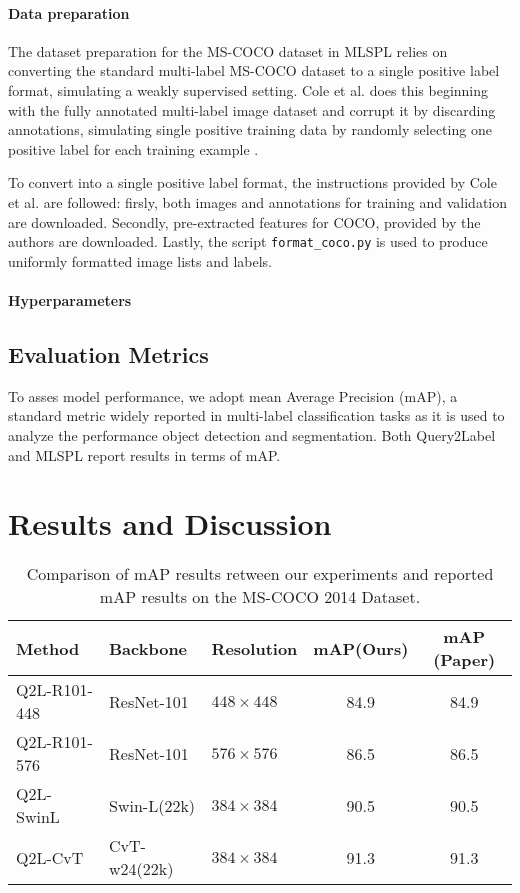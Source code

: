 \documentclass[lettersize,journal]{IEEEtran}
\begin{document}
\paragraph{Data preparation}
The dataset preparation for the MS-COCO dataset in MLSPL relies on converting the standard multi-label MS-COCO dataset to a single positive label format, simulating a weakly supervised setting. Cole et al. does this beginning with the fully annotated multi-label image dataset and corrupt it by discarding annotations, simulating single positive training data by randomly selecting one positive label for each training example \cite{mlsp}.

\vspace{1em}

To convert into a single positive label format, the instructions provided by Cole et al. are followed: firsly, both images and annotations for training and validation are downloaded. Secondly, pre-extracted features for COCO, provided by the authors are downloaded. Lastly, the script \texttt{format\_coco.py} is used to produce uniformly formatted image lists and labels.

\vspace{1em}

\paragraph{Hyperparameters}

\subsection{Evaluation Metrics}
To asses model performance, we adopt mean Average Precision (mAP), a standard metric widely reported in multi-label classification tasks as it is used to analyze the performance object detection and segmentation. Both Query2Label and MLSPL report results in terms of mAP. 


\section{Results and Discussion}
\begin{table*}[!t]
    \small
    \caption{Comparison of mAP results retween our experiments and reported mAP results on the MS-COCO 2014 Dataset.}
    \label{tab:map_comparison}
    \centering
    \begin{tabular}{l l l c c}
    \toprule
    \textbf{Method} & \textbf{Backbone} & \textbf{Resolution} & \textbf{mAP(Ours)} & \textbf{mAP (Paper)} \\
    \midrule
    Q2L-R101-448 & ResNet-101     & $448\times448$ & 84.9 & 84.9 \\
    Q2L-R101-576 & ResNet-101     & $576\times576$ & 86.5 & 86.5 \\
    Q2L-SwinL    & Swin-L(22k)    & $384\times384$ & 90.5 & 90.5 \\
    Q2L-CvT      & CvT-w24(22k)   & $384\times384$ & 91.3 & 91.3 \\
    \bottomrule
    \end{tabular}
\end{table*}
\end{document}
